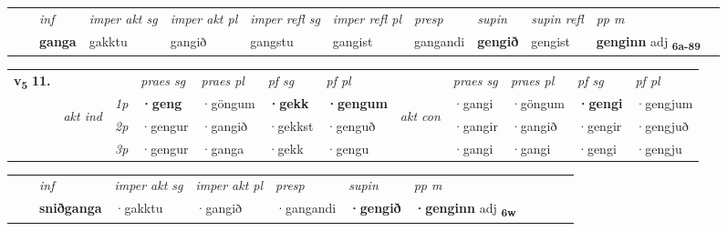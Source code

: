 \begin{tabular}{llllllllllll}
 & & \textit{inf} & \textit{imper akt sg} & \textit{imper akt pl} & \textit{imper refl sg} & \textit{imper refl pl} & \textit{presp} & \textit{supin} & \textit{supin refl} & \textit{pp m}     \\*
  & & \textbf{ganga} & gakktu  & gangið & gangstu & gangist & gangandi &  \textbf{gengið} & gengist & \textbf{genginn} adj \textbf{\textsubscript{6a-89}} \\*
\cmidrule{1-12}
\end{tabular}



\begin{tabular}{llllllllllll} \toprule
\multirow{4}{*}{{{\textbf{v{\textsubscript{5}}} \Large{\textbf{11.}}}}}  & &   &  \textit{praes sg}  & \textit{praes pl}  &\textit{ pf sg} & \textit{pf pl} &  &  \textit{praes sg}  & \textit{praes pl}  & \textit{pf sg} & \textit{pf pl } \\*
	\cmidrule{4-7} \cmidrule{9-12}
 & \multirow{3}{*}{\begin{turn}{90}\textit{akt ind}\end{turn}} & {\textit{1p}} & \textbf{·geng} & ·göngum    & \textbf{·gekk} & \textbf{·gengum} & \multirow{3}{*}{\begin{turn}{90}\textit{akt con}\end{turn}} &·gangi & ·göngum & \textbf{·gengi} & ·gengjum\\*
& &  {\textit{2p}} &  ·gengur  & ·gangið   & ·gekkst & ·genguð & & ·gangir & ·gangið & ·gengir & ·gengjuð \\*
& &  {\textit{3p}} & ·gengur & ·ganga   & ·gekk & ·gengu & & ·gangi & ·gangi& ·gengi & ·gengju  \\*
\cmidrule{4-7} \cmidrule{9-12}
\end{tabular}


\begin{tabular}{llllllllllll}
 & & \textit{inf} & \textit{imper akt sg} & \textit{imper akt pl}   & \textit{presp} & \textit{supin}  & \textit{pp m}     \\*
  & & \textbf{sniðganga} & ·gakktu  & ·gangið   & ·gangandi &  \textbf{·gengið}  & \textbf{·genginn} adj \textbf{\textsubscript{6w}} \\*
\cmidrule{1-12}
\end{tabular}



